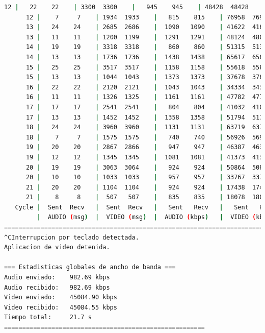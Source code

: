 \begin{lstlisting}[language=bash,basicstyle=\ttfamily\scriptsize]
      12 |   22    22    | 3300  3300    |   945    945    | 48428  48428    |  40     75       
      12 |    7     7    | 1934  1933    |   815    815    | 76958  76918    |  60     75       
      13 |   24    24    | 2685  2686    |  1090   1090    | 41622  41637    |  47     73       
      13 |   11    11    | 1200  1199    |  1291   1291    | 48124  48084    |  50     74       
      14 |   19    19    | 3318  3318    |   860    860    | 51315  51315    |  49     72       
      14 |   13    13    | 1736  1736    |  1438   1438    | 65617  65617    |  57     72       
      15 |   25    25    | 3517  3517    |  1158   1158    | 55618  55618    |  73     77       
      15 |   13    13    | 1044  1043    |  1373   1373    | 37678  37642    |  51     77       
      16 |   22    22    | 2120  2121    |  1043   1043    | 34334  34350    |  60     71       
      16 |   11    11    | 1326  1325    |  1161   1161    | 47782  47746    |  64     70       
      17 |   17    17    | 2541  2541    |   804    804    | 41032  41032    |  31     73       
      17 |   13    13    | 1452  1452    |  1358   1358    | 51794  51794    |  41     73       
      18 |   24    24    | 3960  3960    |  1131   1131    | 63719  63719    |  53     69       
      18 |    7     7    | 1575  1575    |   740    740    | 56926  56926    |  58     67       
      19 |   20    20    | 2867  2866    |   947    947    | 46387  46371    |  57     70       
      19 |   12    12    | 1345  1345    |  1081   1081    | 41373  41373    |  49     74       
      20 |   19    19    | 3063  3064    |   924    924    | 50864  50880    |  50     81       
      20 |   10    10    | 1033  1033    |   957    957    | 33767  33767    |  29     79       
      21 |   20    20    | 1104  1104    |   924    924    | 17438  17438    |  42     74       
      21 |    8     8    |  507   507    |   835    835    | 18078  18078    |  57     73           
   Cycle |  Sent  Recv   |  Sent  Recv   |   Sent   Recv   |   Sent   Recv   | Program System
         |  AUDIO (msg)  |  VIDEO (msg)  |  AUDIO (kbps)   |  VIDEO (kbps)   |     CPU (%) 
===========================================================================================
^CInterrupcion por teclado detectada.
Aplicacion de video detenida.

=== Estadisticas globales de ancho de banda ===
Audio enviado:    982.69 kbps
Audio recibido:   982.69 kbps
Video enviado:    45084.90 kbps
Video recibido:   45084.55 kbps
Tiempo total:     21.7 s
=======================================================
\end{lstlisting}

